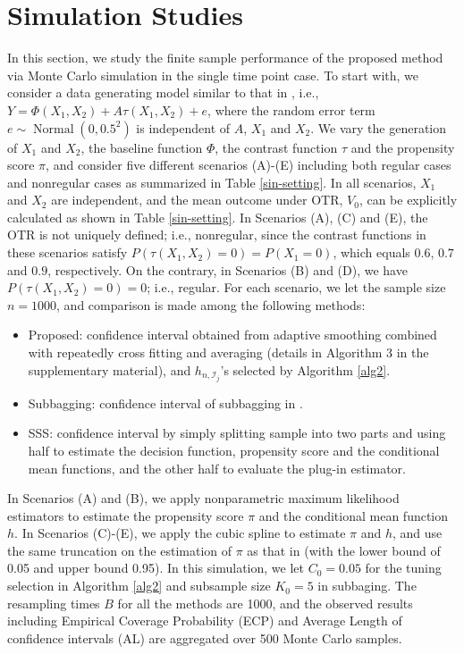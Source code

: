 \documentclass[11pt]{article}
\theoremstyle{referenceplain}
\theoremstyle{referencedefinition}
\theoremstyle{referenceremark}
\begin{document}
\section{Simulation Studies}
In this section, we study the finite sample performance of the proposed method via Monte Carlo simulation in the single time point case. To start with, we consider a data generating model similar to that in \citet{shi2020breaking}, i.e., $Y=\Phi\left(X_{1}, X_{2}\right)+A \tau\left(X_{1}, X_{2}\right)+e$, where the random error term $e\sim \operatorname{Normal}(0,0.5^2)$ is independent of $A$, $X_1$ and $X_2$. We vary the generation of $X_1$ and $X_{2}$, the baseline function $\Phi$, the contrast function $\tau$ and the propensity score $\pi$, and consider five different scenarios (A)-(E) including both regular cases and nonregular cases as summarized in Table \ref{sin-setting}.
In all scenarios, $X_{1}$ and $X_{2}$ are independent, and the mean outcome under OTR, $V_0$, can be explicitly calculated as shown in Table \ref{sin-setting}. In Scenarios (A), (C) and (E), the OTR is not uniquely defined; i.e., nonregular, since the contrast functions in these scenarios satisfy $P\left(\tau\left(X_{1}, X_{2}\right)=0\right)=P\left(X_{1}=0\right)$, which equals $0.6$, $0.7$ and $0.9$, respectively. On the contrary, in Scenarios (B) and (D), we have $P\left(\tau\left(X_{1}, X_{2}\right)=0\right)=0$; i.e., regular. For each scenario, we let the sample size $n=1000$, and comparison is made among the following methods:
\begin{itemize}
    \item Proposed: confidence interval obtained from adaptive smoothing combined with repeatedly cross fitting and averaging (details in Algorithm 3 in the supplementary material), and $h_{n,\mathcal{I}_j}$'s selected by Algorithm \ref{alg2}.
    \item Subbagging: confidence interval of subbagging in \citet{shi2020breaking}.
    \item SSS: confidence interval by simply splitting sample into two parts and using half to estimate the decision function, propensity score and the conditional mean functions, and the other half to evaluate the plug-in estimator.
\end{itemize}

In Scenarios (A) and (B), we apply nonparametric maximum likelihood estimators to estimate the propensity score $\pi$ and the conditional mean function $h$. In Scenarios (C)-(E), we apply the cubic spline to estimate $\pi$ and $h$, and use the same truncation on the estimation of $\pi$ as that in \citet{shi2020breaking} (with the lower bound of 0.05 and upper bound 0.95). In this simulation, we let {$C_0=0.05$} for the tuning selection in Algorithm \ref{alg2} and subsample size $K_0=5$ in subbaging. The resampling times $B$ for all the methods are 1000, and the observed results including Empirical Coverage Probability (ECP) and Average Length of confidence intervals (AL) are aggregated over 500 Monte Carlo samples.
\end{document}
